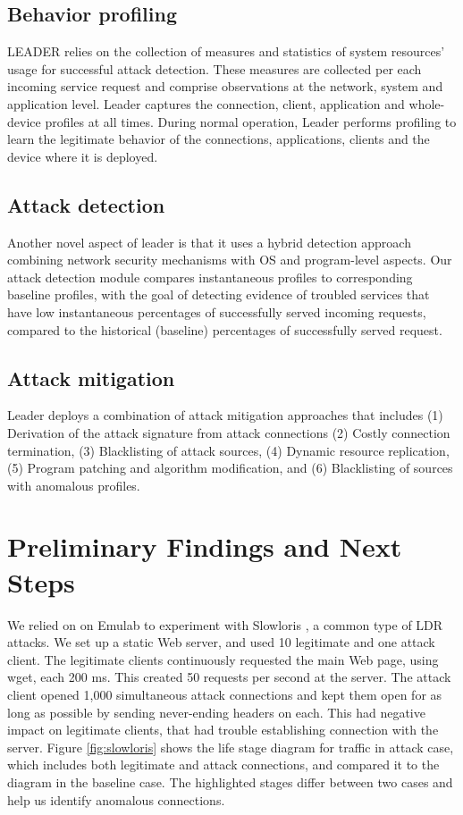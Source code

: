 \documentclass[conference]{IEEEtran}
\begin{document}
\subsection{Behavior profiling}

LEADER relies on the collection of measures and statistics of system resources’ usage for successful attack detection. These measures are collected per each incoming service request and comprise observations at the network, system and application level. Leader captures the connection, client, application and whole-device profiles at all times. During normal operation, Leader performs profiling to learn the legitimate behavior of the connections, applications, clients and the device where it is deployed.

\subsection{Attack detection}

Another novel aspect of leader is that it uses a hybrid detection approach combining network security mechanisms with OS and program-level aspects. Our attack detection module compares instantaneous profiles to corresponding baseline profiles, with the goal of detecting evidence of troubled services that have low instantaneous percentages of successfully served incoming requests, compared to the historical (baseline) percentages of successfully served request.

\subsection{Attack mitigation}

Leader deploys a combination of attack mitigation approaches that includes (1) Derivation of the attack signature from attack connections (2) Costly connection termination, (3) Blacklisting of attack sources, (4) Dynamic resource
replication, (5) Program patching and algorithm modification, and (6) Blacklisting of sources with anomalous profiles.



\section{Preliminary Findings and Next Steps}

We relied on on Emulab \cite{Emulab} to experiment with Slowloris \cite{slowloris}, a common type of LDR attacks. We set up a static Web server,
and used 10 legitimate and one attack client. The legitimate clients continuously requested the main Web
page, using wget, each 200 ms. This created 50 requests per second at the server. The attack client opened
1,000 simultaneous attack connections and kept them open for as long as possible by sending never-ending
headers on each. This had negative impact on legitimate clients, that had trouble establishing connection
with the server. Figure \ref{fig:slowloris} shows the life stage diagram for traffic in attack case, which includes both legitimate
and attack connections, and compared it to the diagram in the baseline case. The highlighted stages differ between two cases and help us identify anomalous connections.
\end{document}
